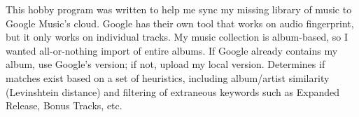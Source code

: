 {
  This hobby program was written to help me sync my missing library of music to Google Music's cloud. Google has their own tool that works on audio fingerprint, but it only works on individual tracks. My music collection is album-based, so I wanted all-or-nothing import of entire albums. If Google already contains my album, use Google's version; if not, upload my local version. Determines if matches exist based on a set of heuristics, including album/artist similarity (Levinshtein distance) and filtering of extraneous keywords such as Expanded Release, Bonus Tracks, etc. 
}
